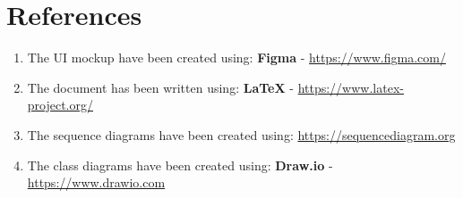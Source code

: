 \chapter{References}

\begin{enumerate}
    \item The UI mockup have been created using: \textbf{Figma} - \url{https://www.figma.com/}
    \item The document has been written using: \textbf{LaTeX} - \url{https://www.latex-project.org/}
    \item The sequence diagrams have been created using: \url{https://sequencediagram.org}
    \item The class diagrams have been created using: \textbf{Draw.io} - \url{https://www.drawio.com}

\end{enumerate}
